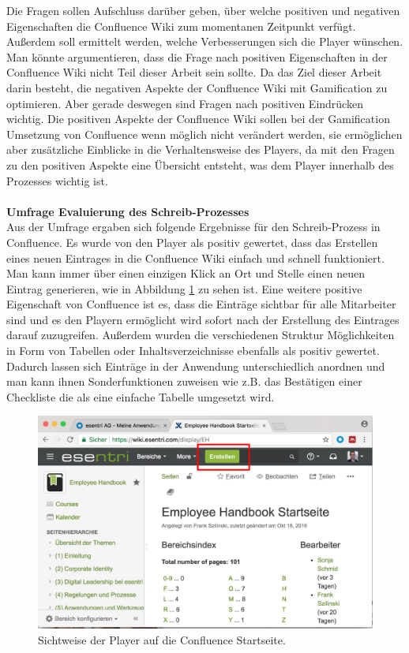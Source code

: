 \documentclass[a4paper,12pt]{scrartcl}
\begin{document}
Die Fragen sollen Aufschluss darüber geben, über welche positiven und negativen Eigenschaften die Confluence Wiki zum momentanen Zeitpunkt verfügt. Außerdem soll ermittelt werden, welche Verbesserungen sich die Player wünschen. Man könnte argumentieren, dass die Frage nach positiven Eigenschaften in der Confluence Wiki nicht Teil dieser Arbeit sein sollte. Da das Ziel dieser Arbeit darin besteht, die negativen Aspekte der Confluence Wiki mit Gamification zu optimieren. Aber gerade deswegen sind Fragen nach positiven Eindrücken wichtig. Die positiven Aspekte der Confluence Wiki sollen bei der Gamification Umsetzung von Confluence wenn möglich nicht verändert werden, sie ermöglichen aber zusätzliche Einblicke in die Verhaltensweise des Players, da mit den Fragen zu den positiven Aspekte eine Übersicht entsteht, was dem Player innerhalb des Prozesses wichtig ist.
\\\\
\textbf{Umfrage Evaluierung des Schreib-Prozesses}\\
Aus der Umfrage ergaben sich folgende Ergebnisse für den Schreib-Prozess in Confluence. Es wurde von den Player als positiv gewertet, dass das Erstellen eines neuen Eintrages in die Confluence Wiki einfach und schnell funktioniert. Man kann immer über einen einzigen Klick an Ort und Stelle einen neuen Eintrag generieren, wie in Abbildung \ref{ConfluenceEintragErstellen} zu sehen ist. Eine weitere positive Eigenschaft von Confluence ist es, dass die Einträge sichtbar für alle Mitarbeiter sind und es den Playern ermöglicht wird sofort nach der Erstellung des Eintrages darauf zuzugreifen. Außerdem wurden die verschiedenen Struktur Möglichkeiten in Form von Tabellen oder Inhaltsverzeichnisse ebenfalls als positiv gewertet. Dadurch lassen sich Einträge in der Anwendung unterschiedlich anordnen und man kann ihnen Sonderfunktionen zuweisen wie z.B. das Bestätigen einer Checkliste die als eine einfache Tabelle umgesetzt wird.
\begin{figure}[h!]
\begin{center}
\includegraphics[scale = 0.4]{Bilder/ConfluenceStart.eps}
\caption{Sichtweise der Player auf die Confluence Startseite.}
\label{ConfluenceEintragErstellen}
\end{center}
\end{figure} 
\end{document}
